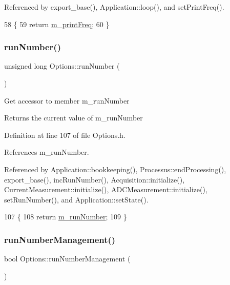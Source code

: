 Referenced by export\+\_\+base(), Application\+::loop(), and set\+Print\+Freq().


\begin{DoxyCode}
58                                    \{
59                 \textcolor{keywordflow}{return} \hyperlink{classOptions_acf8f96cbc3245ec4b3b47bd3bfa0d742}{m\_printFreq};
60         \}
\end{DoxyCode}
\mbox{\label{classOptions_a2d9447919fe90f9ce8df5530526cbb27}} 
\subsubsection{\texorpdfstring{run\+Number()}{runNumber()}}
{\footnotesize\ttfamily unsigned long Options\+::run\+Number (\begin{DoxyParamCaption}{ }\end{DoxyParamCaption})\hspace{0.3cm}{\ttfamily [inline]}}

Get accessor to member m\+\_\+run\+Number \begin{DoxyReturn}{Returns}
the current value of m\+\_\+run\+Number 
\end{DoxyReturn}


Definition at line 107 of file Options.\+h.



References m\+\_\+run\+Number.



Referenced by Application\+::bookkeeping(), Processus\+::end\+Processing(), export\+\_\+base(), inc\+Run\+Number(), Acquisition\+::initialize(), Current\+Measurement\+::initialize(), A\+D\+C\+Measurement\+::initialize(), set\+Run\+Number(), and Application\+::set\+State().


\begin{DoxyCode}
107                                    \{
108                 \textcolor{keywordflow}{return} \hyperlink{classOptions_a1762c644c5f87feabe12f84f17a1a351}{m\_runNumber};
109         \}
\end{DoxyCode}
\mbox{\label{classOptions_a7654a2c3d67baae08f61edc18bec367e}} 
\subsubsection{\texorpdfstring{run\+Number\+Management()}{runNumberManagement()}}
{\footnotesize\ttfamily bool Options\+::run\+Number\+Management (\begin{DoxyParamCaption}{ }\end{DoxyParamCaption})\hspace{0.3cm}{\ttfamily [inline]}}

